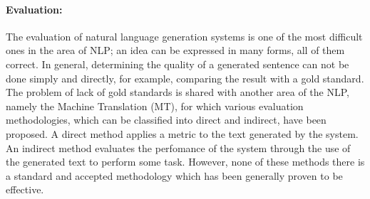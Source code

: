 
\paragraph{Evaluation:} The evaluation of natural language generation systems
is one of the
most difficult ones in the area of NLP; an idea can be expressed in many
forms, all of them correct. In general, determining the quality of a
generated sentence can not be done simply and directly, for example, comparing
the result with a gold standard. The problem of lack of gold standards is shared
with another area of the NLP, namely the Machine Translation (MT), for which
various evaluation methodologies, which can be classified into direct and
indirect, have been proposed. A direct method applies a metric to the text
generated by the system. An indirect method evaluates the perfomance of the
system through the use of the generated text to perform some task. However, 
none of these methods there is a standard and accepted methodology which has
been generally proven to be effective.


